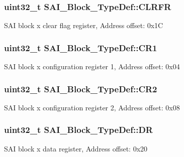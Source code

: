 \subsubsection[{\texorpdfstring{C\+L\+R\+FR}{CLRFR}}]{ uint32\+\_\+t S\+A\+I\+\_\+\+Block\+\_\+\+Type\+Def\+::\+C\+L\+R\+FR}\hypertarget{struct_s_a_i___block___type_def_a52dffdfbe572129cc142023f3daeeffe}{}\label{struct_s_a_i___block___type_def_a52dffdfbe572129cc142023f3daeeffe}
S\+AI block x clear flag register, Address offset\+: 0x1C 
\subsubsection[{\texorpdfstring{C\+R1}{CR1}}]{ uint32\+\_\+t S\+A\+I\+\_\+\+Block\+\_\+\+Type\+Def\+::\+C\+R1}\hypertarget{struct_s_a_i___block___type_def_a8935f3f22c733c1cb5a05cecf3cfa38c}{}\label{struct_s_a_i___block___type_def_a8935f3f22c733c1cb5a05cecf3cfa38c}
S\+AI block x configuration register 1, Address offset\+: 0x04 
\subsubsection[{\texorpdfstring{C\+R2}{CR2}}]{ uint32\+\_\+t S\+A\+I\+\_\+\+Block\+\_\+\+Type\+Def\+::\+C\+R2}\hypertarget{struct_s_a_i___block___type_def_ad9976416e6199c8c1f7bcdabe20e4bd2}{}\label{struct_s_a_i___block___type_def_ad9976416e6199c8c1f7bcdabe20e4bd2}
S\+AI block x configuration register 2, Address offset\+: 0x08 
\subsubsection[{\texorpdfstring{DR}{DR}}]{ uint32\+\_\+t S\+A\+I\+\_\+\+Block\+\_\+\+Type\+Def\+::\+DR}\hypertarget{struct_s_a_i___block___type_def_a9217ce4fb1e7e16dc0ead8523a6c045a}{}\label{struct_s_a_i___block___type_def_a9217ce4fb1e7e16dc0ead8523a6c045a}
S\+AI block x data register, Address offset\+: 0x20 
